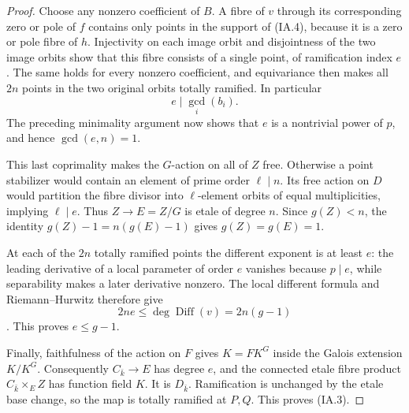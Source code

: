 \begin{proof}
Choose any nonzero coefficient of $B$. A fibre of $v$ through its
corresponding zero or pole of $f$ contains only points in the support of
(IA.4), because it is a zero or pole fibre of $h$. Injectivity on each
image orbit and disjointness of the two image orbits show that this
fibre consists of a single point, of ramification index $e$. The same
holds for every nonzero coefficient, and equivariance then makes all
$2n$ points in the two original orbits totally ramified. In particular
\[
                           e\mid\gcd_i(b_i).
\tag{IA.8}
\]
The preceding minimality argument now shows that $e$ is a nontrivial
power of $p$, and hence $\gcd(e,n)=1$.

This last coprimality makes the $G$-action on all of $Z$ free. Otherwise
a point stabilizer would contain an element of prime order $\ell\mid n$.
Its free action on $D$ would partition the fibre divisor into
$\ell$-element orbits of equal multiplicities, implying $\ell\mid e$.
Thus $Z\to E=Z/G$ is etale of degree $n$. Since $g(Z)<n$, the identity
$g(Z)-1=n(g(E)-1)$ gives $g(Z)=g(E)=1$.

At each of the $2n$ totally ramified points the different exponent is
at least $e$: the leading derivative of a local parameter of order
$e$ vanishes because $p\mid e$, while separability makes a later
derivative nonzero. The local different formula and Riemann--Hurwitz
therefore give
\[
                  2ne\le\deg\operatorname{Diff}(v)=2n(g-1)
\tag{IA.9}
\]
\cite[Lemma~53.12.4, Tag~\texttt{0C1F}]{StacksRH}.
This proves $e\le g-1$.

Finally, faithfulness of the action on $F$ gives $K=FK^G$ inside the
Galois extension $K/K^G$. Consequently $C_{\bar k}\to E$ has degree
$e$, and the connected etale fibre product $C_{\bar k}\times_E Z$ has
function field $K$. It is $D_{\bar k}$. Ramification is unchanged by
the etale base change, so the map is totally ramified at $P,Q$.
This proves (IA.3).
\end{proof}

